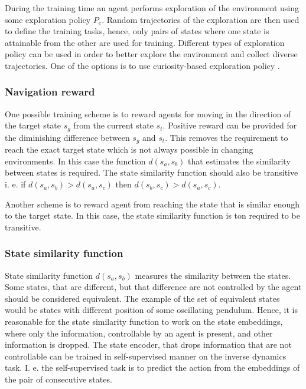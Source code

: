 \documentclass{article}
\begin{document}
During the training time an agent performs exploration of the environment using some exploration policy $P_e$. Random trajectories of the exploration are then used to define the training tasks, hence, only pairs of states where one state is attainable from the other are used for training. Different types of exploration policy can be used in order to better explore the environment and collect diverse trajectories. One of the options is to use curiosity-based exploration policy \citep{Pathak2017CuriosityDrivenEB, Burda2019ExplorationBR}.

\subsubsection{Navigation reward}

One possible training scheme is to reward agents for moving in the direction of the target state $s_g$ from the current state $s_t$. Positive reward can be provided for the diminishing difference between $s_g$ and $s_t$. This removes the requirement to reach the exact target state which is not always possible in changing environments. In this case the function $d(s_a, s_b)$ that estimates the similarity between states is required. The state similarity function should also be transitive i. e. if $d(s_a, s_b) > d(s_a, s_c)$ then $d(s_b, s_c) > d(s_a, s_c)$.

Another scheme is to reward agent from reaching the state that is similar enough to the target state. In this case, the state similarity function is ton required to be transitive.

\subsubsection{State similarity function}

State similarity function $d(s_a, s_b)$ measures the similarity between the states. Some states, that are different, but that difference are not controlled by the agent should be considered equivalent. The example of the set of equivalent states would be states with different position of some oscillating pendulum. Hence, it is reasonable for the state similarity function to work on the state embeddings, where only the information, controllable by an agent is present, and other information is dropped. The state encoder, that drops information that are not controllable can be trained in self-supervised manner on the inverse dynamics task. I. e. the self-supervised  task is to predict the action from the embeddings of the pair of consecutive states.
\end{document}
